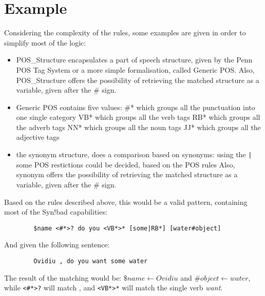 \documentclass[10pt]{article}
\newcommand{\synbad}{Syn!bad }
\begin{document}
\section{Example}

Considering the complexity of the rules, some examples are given in order to simplify most of the logic:

\begin{itemize}
	\item POS_Structure encapsulates a part of speech structure, given by the Penn POS Tag System or a more simple formalisation, called Generic POS. 
	\subitem Also, POS_Structure offers the possibility of retrieving the matched structure as a variable, given after the \# sign.
	\item Generic POS contains five values: 
		\subitem \#* which groups all the punctuation into one single category
		\subitem VB* which groups all the verb tags
		\subitem RB* which groups all the adverb tags
		\subitem NN* which groups all the noun tags		
		\subitem JJ* which groups all the adjective tags
	\item the synonym structure, does a comparison based on synonyms:
		\subitem using the \verb=|= some POS restictions could be decided, based on the POS rules
		\subitem Also, synonym offers the possibility of retrieving the matched structure as a variable, given after the \# sign.
\end{itemize}

Based on the rules described above, this would be a valid pattern, containing most of the \synbad capabilities:

\begin{center}
	\begin{verbatim}
		$name <#*>? do you <VB*>* [some|RB*] [water#object] 
	\end{verbatim}
\end{center}

And given the following sentence:
\begin{center}
	\begin{verbatim}
		Ovidiu , do you want some water
	\end{verbatim}
\end{center}

The result of the matching would be: $\$name \leftarrow Ovidiu$ and $\#object \leftarrow water$, while \verb=<#*>?= will match , and \verb=<VB*>*= will match the single verb \textit{want}.
\end{document}
